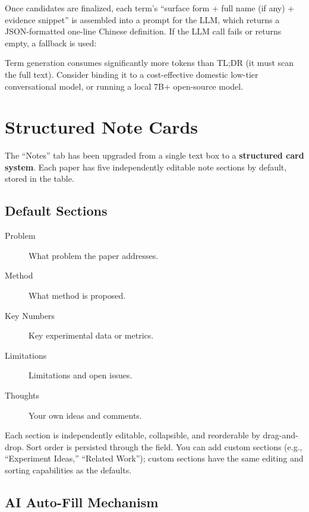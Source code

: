 Once candidates are finalized, each term's ``surface form + full name (if any) +
evidence snippet'' is assembled into a prompt for the LLM, which returns a JSON-formatted
one-line Chinese definition. If the LLM call fails or returns empty, a fallback is used:

\begin{tipbox}
Term generation consumes significantly more tokens than TL;DR (it must scan the full
text). Consider binding it to a cost-effective domestic low-tier conversational model,
or running a local 7B+ open-source model.
\end{tipbox}

\section{Structured Note Cards}

The ``Notes'' tab has been upgraded from a single text box to a \textbf{structured card
system}. Each paper has five independently editable note sections by default, stored in
the  table.

\subsection{Default Sections}

\begin{description}
  \item[Problem] What problem the paper addresses.
  \item[Method] What method is proposed.
  \item[Key Numbers] Key experimental data or metrics.
  \item[Limitations] Limitations and open issues.
  \item[Thoughts] Your own ideas and comments.
\end{description}

Each section is independently editable, collapsible, and reorderable by drag-and-drop.
Sort order is persisted through the  field. You can add custom sections
(e.g., ``Experiment Ideas,'' ``Related Work''); custom sections have the same editing
and sorting capabilities as the defaults.

\subsection{AI Auto-Fill Mechanism}

